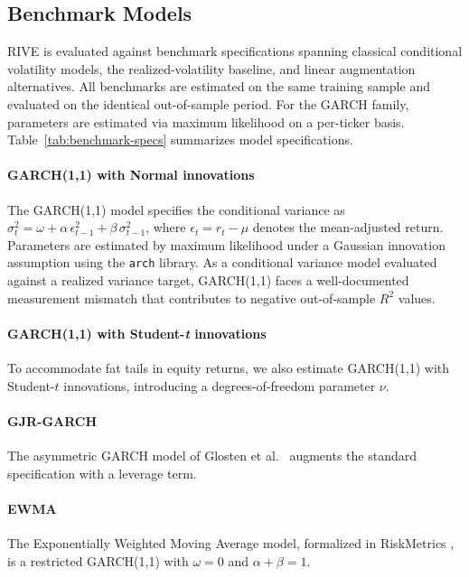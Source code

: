 \documentclass[review]{elsarticle}
\begin{document}
\subsection{Benchmark Models}\label{benchmark-models-setup}

RIVE is evaluated against benchmark specifications spanning classical conditional volatility models, the realized-volatility baseline, and linear augmentation alternatives. All benchmarks are estimated on the same training sample and evaluated on the identical out-of-sample period. For the GARCH family, parameters are estimated via maximum likelihood on a per-ticker basis. Table~\ref{tab:benchmark-specs} summarizes model specifications. %

\paragraph{GARCH(1,1) with Normal innovations}
The GARCH(1,1) model \cite{bollerslev1986} specifies the conditional variance as $\sigma_t^2 = \omega + \alpha\,\epsilon_{t-1}^2 + \beta\,\sigma_{t-1}^2$, where $\epsilon_t = r_t - \mu$ denotes the mean-adjusted return. Parameters are estimated by maximum likelihood under a Gaussian innovation assumption using the \texttt{arch} library. %
As a conditional variance model evaluated against a realized variance target, GARCH(1,1) faces a well-documented measurement mismatch \cite{andersen1998,hansen2005} that contributes to negative out-of-sample $R^2$ values.

\paragraph{GARCH(1,1) with Student-\textit{t} innovations}
To accommodate fat tails in equity returns, we also estimate GARCH(1,1) with Student-$t$ innovations, introducing a degrees-of-freedom parameter $\nu$.

\paragraph{GJR-GARCH}
The asymmetric GARCH model of Glosten et al.~\cite{glosten1993} augments the standard specification with a leverage term.

\paragraph{EWMA}
The Exponentially Weighted Moving Average model, formalized in RiskMetrics \cite{jpm1996}, is a restricted GARCH(1,1) with $\omega = 0$ and $\alpha + \beta = 1$.
\end{document}

